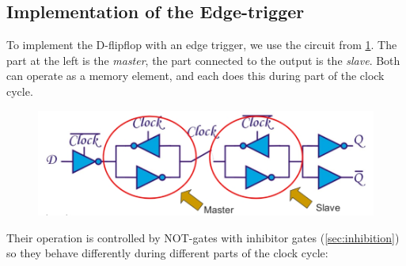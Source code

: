 \subsection{Implementation of the Edge-trigger}
To implement the D-flipflop with an edge trigger, we use the circuit from \ref{fig:edge_trigger1}. The part at the left is the \emph{master}, the part connected to the output is the \emph{slave}. Both can operate as a memory element, and each does this during part of the clock cycle. \\
\begin{figure}[h!]
	\centering
	\includegraphics[width=12cm]{figures/ch17/edge_trigger1.jpg}
	\caption{}
	\label{fig:edge_trigger1}
\end{figure}
Their operation is controlled by NOT-gates with inhibitor gates (\ref{sec:inhibition}) so they behave differently during different parts of the clock cycle:
